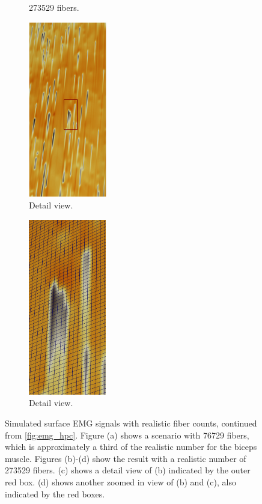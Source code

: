 \begin{figure}
\begin{subfigure}{0.30\textwidth}
    \caption{\num{273529} fibers.}%
    \label{fig:emg273529b}%
  \end{subfigure}\hspace{-1cm}
  \begin{minipage}{0.5\textwidth}
    \vspace{48mm}
    \begin{subfigure}[t]{0.5\textwidth}%
      \centering%
      \includegraphics[height=77mm]{images/results/application/emg523-1.pdf}%
      \caption{Detail view.}%
      \label{fig:emg273529c}%
    \end{subfigure}\hspace{-5mm}
    \begin{subfigure}[t]{0.49\textwidth}%
      \centering%
      \includegraphics[height=77mm]{images/results/application/emg523-2.png}%
      \caption{Detail view.}%
      \label{fig:emg273529d}%
    \end{subfigure}
  \end{minipage}
  \caption{Simulated surface EMG signals with realistic fiber counts, continued from \cref{fig:emg_hpc}. Figure (a) shows a scenario with \num{76729} fibers, which is approximately a third of the realistic number for the biceps muscle. Figures (b)-(d) show the result with a realistic number of \num{273529} fibers. (c) shows a detail view of (b) indicated by the outer red box. (d) shows another zoomed in view of (b) and (c), also indicated by the red boxes.}%
  \label{fig:emg_hpc2}%
\end{figure}%

